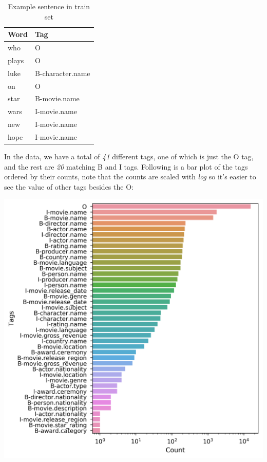 \documentclass[11pt,a4paper]{article}
\begin{document}
	\begin{table}[h]
		\begin{tabularx}{198pt}{l | l}
			\centering
	 	 	\textbf{Word} & \textbf{Tag} \\
			\hline 
			who & O \\
			plays & O \\
			luke & B-character.name \\
			on & O \\
			star & B-movie.name \\
			wars & I-movie.name \\
			new & I-movie.name \\
			hope & I-movie.name \\
 		\end{tabularx} 
		\caption{Example sentence in train set}
		\label{table:example-sentence}	
	\end{table}

	
	In the data, we have a total of \textit{41} different tags, one of which is just the O tag, and the rest are \textit{20} matching B and I tags. Following is a bar plot of the tags ordered by their counts, note that the counts are scaled with \textit{log} so it's easier to see the value of other tags besides the O:
	
	\hspace*{-0.4cm}\includegraphics[scale=0.5]{barplot_iob_tag_counts}
\end{document}
